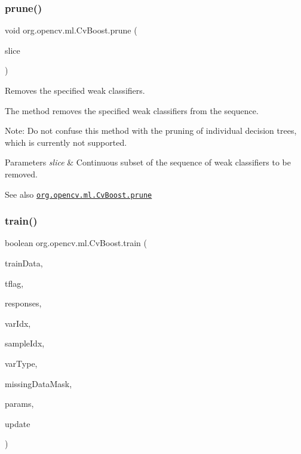 \subsubsection{\texorpdfstring{prune()}{prune()}}
{\footnotesize\ttfamily void org.\+opencv.\+ml.\+Cv\+Boost.\+prune (\begin{DoxyParamCaption}\item[{\mbox{\hyperlink{classorg_1_1opencv_1_1core_1_1_range}{Range}}}]{slice }\end{DoxyParamCaption})}

Removes the specified weak classifiers.

The method removes the specified weak classifiers from the sequence.

Note\+: Do not confuse this method with the pruning of individual decision trees, which is currently not supported.


\begin{DoxyParams}{Parameters}
{\em slice} & Continuous subset of the sequence of weak classifiers to be removed.\\
\hline
\end{DoxyParams}
\begin{DoxySeeAlso}{See also}
\href{http://docs.opencv.org/modules/ml/doc/boosting.html#cvboost-prune}{\tt org.\+opencv.\+ml.\+Cv\+Boost.\+prune} 
\end{DoxySeeAlso}
\mbox{\label{classorg_1_1opencv_1_1ml_1_1_cv_boost_acedbe8d37fcbe7789132b0e8b65e6d38}} 
\subsubsection{\texorpdfstring{train()}{train()}\hspace{0.1cm}{\footnotesize\ttfamily [1/2]}}
{\footnotesize\ttfamily boolean org.\+opencv.\+ml.\+Cv\+Boost.\+train (\begin{DoxyParamCaption}\item[{\mbox{\hyperlink{classorg_1_1opencv_1_1core_1_1_mat}{Mat}}}]{train\+Data,  }\item[{int}]{tflag,  }\item[{\mbox{\hyperlink{classorg_1_1opencv_1_1core_1_1_mat}{Mat}}}]{responses,  }\item[{\mbox{\hyperlink{classorg_1_1opencv_1_1core_1_1_mat}{Mat}}}]{var\+Idx,  }\item[{\mbox{\hyperlink{classorg_1_1opencv_1_1core_1_1_mat}{Mat}}}]{sample\+Idx,  }\item[{\mbox{\hyperlink{classorg_1_1opencv_1_1core_1_1_mat}{Mat}}}]{var\+Type,  }\item[{\mbox{\hyperlink{classorg_1_1opencv_1_1core_1_1_mat}{Mat}}}]{missing\+Data\+Mask,  }\item[{\mbox{\hyperlink{classorg_1_1opencv_1_1ml_1_1_cv_boost_params}{Cv\+Boost\+Params}}}]{params,  }\item[{boolean}]{update }\end{DoxyParamCaption})}

